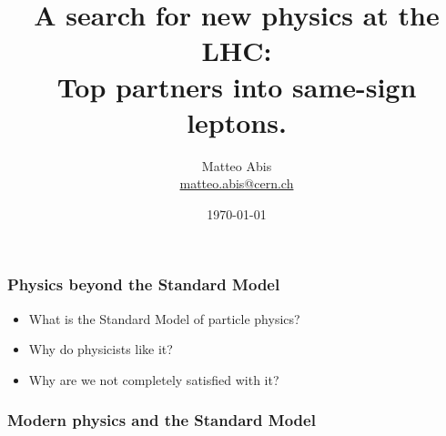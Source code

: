 \documentclass[ukenglish]{beamer}
\title[Top Partners at the LHC]{A search for new physics at the LHC:\\
Top partners into same-sign leptons.}
\author{Matteo Abis\\
\url{matteo.abis@cern.ch}}
\institute{Università di Padova and CERN}
\date{\today}
\begin{document}
\begin{frame}
  \titlepage
\end{frame}
 
\begin{frame}
    \frametitle{Physics beyond the Standard Model}
    \begin{itemize}
        \item What is the Standard Model of particle physics?
        \item Why do physicists like it?
        \item Why are we not completely satisfied with it?
    \end{itemize}
\end{frame}

\begin{frame}
    \frametitle{Modern physics and the Standard Model}
\end{frame}
\end{document}
